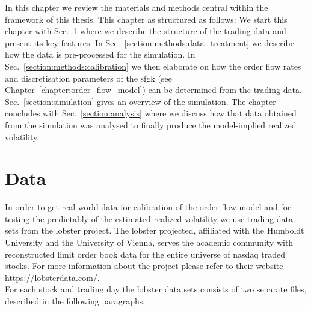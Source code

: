\documentclass[11pt, a4paper]{thesis}  %
\begin{document}
In this chapter we review the materials and methods central within the framework of this thesis.
%
%
\noindent This chapter as structured as follows: 
%
%
We start this chapter with Sec.~\ref{section:methods:data} where we describe the structure of the trading data and present its key features. 
%
%
In Sec.~\ref{section:methods:data_treatment} we describe how the data is pre-processed for the simulation.
%
%
In Sec.~\ref{section:methods:calibration} we then elaborate on how the order flow rates and discretisation parameters of the \ac{sfgk} (see Chapter~\ref{chapter:order_flow_model}) can be determined from the trading data. 
%
%
Sec.~\ref{section:simulation} gives an overview of the simulation. 
%
%
The chapter concludes with Sec.~\ref{section:analysis} where we discuss how that data obtained from the simulation was analysed to finally produce the model-implied realized volatility.
%

\section{Data}
\label{section:methods:data}
In order to get real-world data for calibration of the order flow model and for testing the predictably of the estimated realized volatility we use trading data sets from the \ac{lobster} project. The \ac{lobster} projected, affiliated with the Humboldt University and the University of Vienna, serves the academic community  with reconstructed limit order book data for the entire universe of \ac{nasdaq} traded stocks. For more information about the project please refer to their website \href{https://lobsterdata.com/}{https://lobsterdata.com/}. 
\\
For each stock and trading day the \ac{lobster} data sets consists of two separate files, described in the following paragraphs: 
\end{document}
